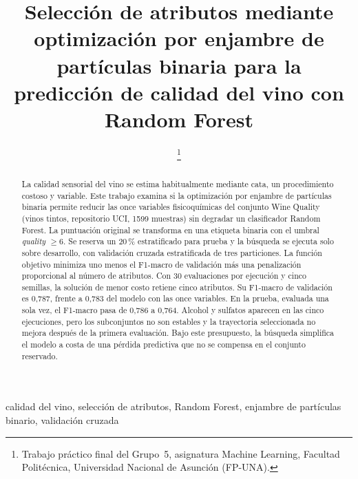 \documentclass[conference]{IEEEtran}
\begin{document}
\title{Selección de atributos mediante optimización por enjambre de partículas binaria para la predicción de calidad del vino con Random Forest}

\author{%
\and
{}
\thanks{Trabajo práctico final del Grupo~5, asignatura Machine Learning, Facultad Politécnica, Universidad Nacional de Asunción (FP-UNA).}%
}

\maketitle

\begin{abstract}
La calidad sensorial del vino se estima habitualmente mediante cata, un procedimiento costoso y variable. Este trabajo examina si la optimización por enjambre de partículas binaria permite reducir las once variables fisicoquímicas del conjunto Wine Quality (vinos tintos, repositorio UCI, 1599 muestras) sin degradar un clasificador Random Forest. La puntuación original se transforma en una etiqueta binaria con el umbral \emph{quality} $\geq 6$. Se reserva un 20\,\% estratificado para prueba y la búsqueda se ejecuta solo sobre desarrollo, con validación cruzada estratificada de tres particiones. La función objetivo minimiza uno menos el F1-macro de validación más una penalización proporcional al número de atributos. Con 30 evaluaciones por ejecución y cinco semillas, la solución de menor costo retiene cinco atributos. Su F1-macro de validación es 0,787, frente a 0,783 del modelo con las once variables. En la prueba, evaluada una sola vez, el F1-macro pasa de 0,786 a 0,764. Alcohol y sulfatos aparecen en las cinco ejecuciones, pero los subconjuntos no son estables y la trayectoria seleccionada no mejora después de la primera evaluación. Bajo este presupuesto, la búsqueda simplifica el modelo a costa de una pérdida predictiva que no se compensa en el conjunto reservado.
\end{abstract}

\begin{IEEEkeywords}
calidad del vino, selección de atributos, Random Forest, enjambre de partículas binario, validación cruzada
\end{IEEEkeywords}
\end{document}
